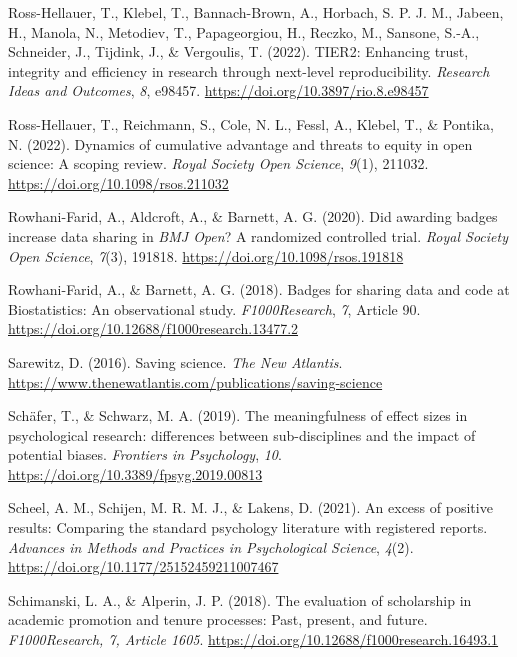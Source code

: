 \documentclass[authordate, meta]{jote-new-article}
\begin{document}
	Ross-Hellauer, T., Klebel, T., Bannach-Brown, A., Horbach, S. P. J. M., Jabeen, H., Manola, N., Metodiev, T., Papageorgiou, H., Reczko, M., Sansone, S.-A., Schneider, J., Tijdink, J., \& Vergoulis, T. (2022). TIER2: Enhancing trust, integrity and efficiency in research through next-level reproducibility. \emph{Research Ideas and Outcomes}, \emph{8}, e98457. \url{https://doi.org/10.3897/rio.8.e98457}



	Ross-Hellauer, T., Reichmann, S., Cole, N. L., Fessl, A., Klebel, T., \& Pontika, N. (2022). Dynamics of cumulative advantage and threats to equity in open science: A scoping review. \emph{Royal Society Open Science}, \emph{9}(1), 211032. \url{https://doi.org/10.1098/rsos.211032}



	Rowhani-Farid, A., Aldcroft, A., \& Barnett, A. G. (2020). Did awarding badges increase data sharing in \emph{BMJ Open}? A randomized controlled trial. \emph{Royal Society Open Science}, \emph{7}(3), 191818. \url{https://doi.org/10.1098/rsos.191818}



	Rowhani-Farid, A., \& Barnett, A. G. (2018). Badges for sharing data and code at Biostatistics: An observational study. \emph{F1000Research}, \emph{7}, Article 90. \url{https://doi.org/10.12688/f1000research.13477.2}



	Sarewitz, D. (2016). Saving science. \emph{The New Atlantis}. \url{https://www.thenewatlantis.com/publications/saving-science}



	Schäfer, T., \& Schwarz, M. A. (2019). The meaningfulness of effect sizes in psychological research: differences between sub-disciplines and the impact of potential biases. \emph{Frontiers in Psychology}, \emph{10}. \url{https://doi.org/10.3389/fpsyg.2019.00813}



	Scheel, A. M., Schijen, M. R. M. J., \& Lakens, D. (2021). An excess of positive results: Comparing the standard psychology literature with registered reports. \emph{Advances in Methods and Practices in Psychological Science}, \emph{4}(2). \url{https://doi.org/10.1177/25152459211007467}



	Schimanski, L. A., \& Alperin, J. P. (2018). The evaluation of scholarship in academic promotion and tenure processes: Past, present, and future. \emph{F1000Research, 7, Article 1605}. \url{https://doi.org/10.12688/f1000research.16493.1}
\end{document}
